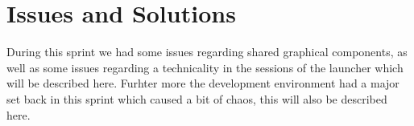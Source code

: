 \chapter{Issues and Solutions}
\label{cha:issues_and_solutions}

During this sprint we had some issues regarding shared graphical components, as well as some issues regarding a technicality in the sessions of the launcher which will be described here. Furhter more the development environment had a major set back in this sprint which caused a bit of chaos, this will also be described here.










